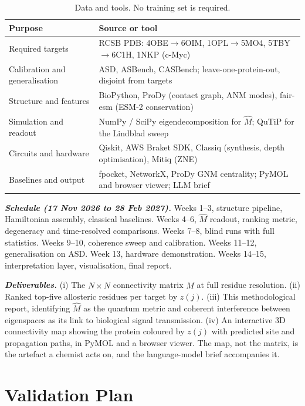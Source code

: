 \documentclass[10pt,a4paper]{article}
\newcommand{\Mhat}{\hat{M}}
\newcommand{\lead}[1]{\textbf{\textit{#1}}}
\begin{document}
\begin{table}[t]
\caption{Data and tools. No training set is required.}
\small
\begin{tabularx}{\textwidth}{@{}lX@{}}
\toprule
\textbf{Purpose} & \textbf{Source or tool}\\
\midrule
Required targets & RCSB PDB: 4OBE$\to$6OIM, 1OPL$\to$5MO4, 5TBY$\to$6C1H, 1NKP (c-Myc)\\
Calibration and generalisation & ASD, ASBench, CASBench; leave-one-protein-out, disjoint from targets\\
Structure and features & BioPython, ProDy (contact graph, ANM modes), fair-esm (ESM-2 conservation)\\
Simulation and readout & NumPy / SciPy eigendecomposition for $\Mhat$; QuTiP for the Lindblad sweep\\
Circuits and hardware & Qiskit, AWS Braket SDK, Classiq (synthesis, depth optimisation), Mitiq (ZNE)\\
Baselines and output & fpocket, NetworkX, ProDy GNM centrality; PyMOL and browser viewer; LLM brief\\
\bottomrule
\end{tabularx}
\end{table}

\lead{Schedule (17 Nov 2026 to 28 Feb 2027).} Weeks 1--3, structure pipeline, Hamiltonian assembly,
classical baselines. Weeks 4--6, $\Mhat$ readout, ranking metric, degeneracy and time-resolved
comparisons. Weeks 7--8, blind runs with full statistics. Weeks 9--10, coherence sweep and
calibration. Weeks 11--12, generalisation on ASD. Week 13, hardware demonstration. Weeks 14--15,
interpretation layer, visualisation, final report.

\lead{Deliverables.} (i) The $N\times N$ connectivity matrix $\Mhat$ at full residue resolution.
(ii) Ranked top-five allosteric residues per target by $z(j)$. (iii) This methodological report,
identifying $\Mhat$ as the quantum metric and coherent interference between eigenspaces as its link
to biological signal transmission. (iv) An interactive 3D connectivity map showing the protein
coloured by $z(j)$ with predicted site and propagation paths, in PyMOL and a browser viewer. The map,
not the matrix, is the artefact a chemist acts on, and the language-model brief accompanies it.

\section{Validation Plan}
\end{document}

